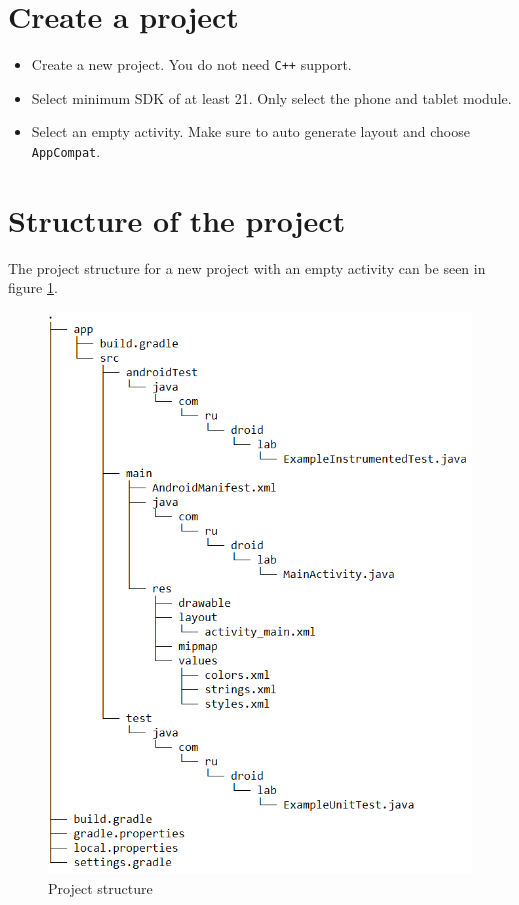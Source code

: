 \section{Create a project}
\begin{itemize}
\item Create a new project. You do not need \verb!C++! support.
\item Select minimum SDK of at least 21. Only select the phone and tablet module.
\item Select an empty activity. Make sure to auto generate layout and choose \verb!AppCompat!.
\end{itemize}

\section{Structure of the project}
The project structure for a new project with an empty activity can be seen in figure \ref{fig:prstr}.

\begin{figure}[H]
\centering
\includegraphics[scale=.75]{project_structure.png}
\caption{Project structure}
\label{fig:prstr}
\end{figure}

